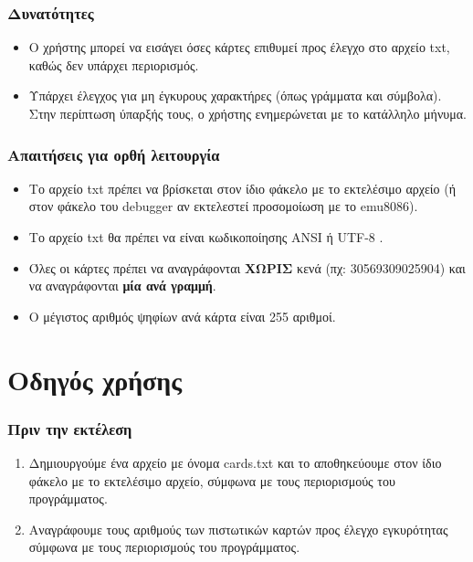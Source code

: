 \documentclass[10pt,a4paper]{article}
\begin{document}
\subsubsection*{Δυνατότητες}
\begin{itemize}
\item Ο χρήστης μπορεί να εισάγει όσες κάρτες επιθυμεί προς έλεγχο στο αρχείο \latintext txt\greektext , καθώς δεν υπάρχει περιορισμός.
\item Υπάρχει έλεγχος για μη έγκυρους χαρακτήρες (όπως γράμματα και σύμβολα). Στην περίπτωση ύπαρξής τους, ο χρήστης ενημερώνεται με το κατάλληλο μήνυμα.
\end{itemize}

\subsubsection*{Απαιτήσεις για ορθή λειτουργία}
\begin{itemize}
\item Το αρχείο \latintext txt \greektext πρέπει να βρίσκεται στον ίδιο φάκελο με το εκτελέσιμο αρχείο (ή στον φάκελο του debugger αν εκτελεστεί προσομοίωση με το emu8086).
\item Το αρχείο \latintext txt \greektext θα πρέπει να είναι κωδικοποίησης \latintext ANSI \greektext ή \latintext UTF-8 \greektext.
\item Όλες οι κάρτες πρέπει να αναγράφονται \textbf{ΧΩΡΙΣ} κενά (πχ: 30569309025904) και να αναγράφονται \textbf{μία ανά γραμμή}.
\item Ο μέγιστος αριθμός ψηφίων ανά κάρτα είναι 255 αριθμοί.
\end{itemize}

\section*{Οδηγός χρήσης}

\subsubsection*{Πριν την εκτέλεση}
\begin{enumerate}
\item Δημιουργούμε ένα αρχείο με όνομα \latintext cards.txt \greektext και το αποθηκεύουμε στον ίδιο φάκελο με το εκτελέσιμο αρχείο, σύμφωνα με τους περιορισμούς του προγράμματος.
\item Αναγράφουμε τους αριθμούς των πιστωτικών καρτών προς έλεγχο εγκυρότητας σύμφωνα με τους περιορισμούς του προγράμματος.
\end{enumerate}
\end{document}
